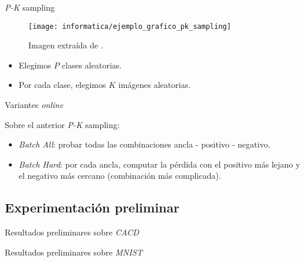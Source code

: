 \begin{frame}{\textit{P-K} sampling}

	\begin{figure}
		\texttt{[image: informatica/ejemplo\_grafico\_pk\_sampling]}
		\caption{Imagen extraída de \cite{informatica:paper_image_pk_sampling}.}
	\end{figure}

	\begin{itemize}
		\item Elegimos $P$ clases aleatorias.
		\item Por cada clase, elegimos $K$ imágenes aleatorias.
	\end{itemize}

\end{frame}

\begin{frame}{Variantes \textit{online}}

	Sobre el anterior \textit{P-K} sampling:

	\begin{itemize}
		\item \textit{Batch All}: probar todas las combinaciones ancla - positivo - negativo.
		\item \textit{Batch Hard}: por cada ancla, computar la pérdida con el positivo más lejano y el negativo más cercano (combinación más complicada).
	\end{itemize}

\end{frame}

\subsection{Experimentación preliminar}
\begin{frame}{Resultados preliminares sobre \textit{CACD}}

\end{frame}

\begin{frame}{Resultados preliminares sobre \textit{MNIST}}

\end{frame}
